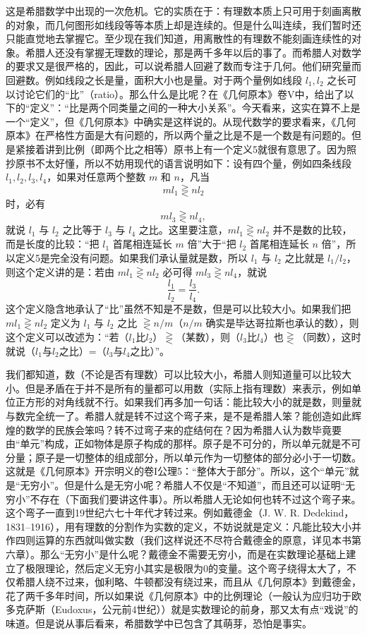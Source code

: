 这是希腊数学中出现的一次危机。它的实质在于：有理数本质上只可用于刻画离散的对象，而几何图形如线段等等本质上却是连续的。但是什么叫连续，我们暂时还只能直觉地去掌握它。至少现在我们知道，用离散性的有理数不能刻画连续性的对象。希腊人还没有掌握无理数的理论，那是两千多年以后的事了。而希腊人对数学的要求又是很严格的，因此，可以说希腊人回避了数而专注于几何。他们研究量而回避数。例如线段之长是量，面积大小也是量。对于两个量例如线段 $l_1,l_2$ 之长可以讨论它们的“比”（ratio）。那么什么是比呢？在《几何原本》卷V中，给出了以下的“定义”：“比是两个同类量之间的一种大小关系”。今天看来，这实在算不上是一个“定义”，但《几何原本》中确实是这样说的。从现代数学的要求看来，《几何原本》在严格性方面是大有问题的，所以两个量之比是不是一个数是有问题的。但是紧接着讲到比例（即两个比之相等）原书上有一个定义5就很有意思了。因为照抄原书不太好懂，所以不妨用现代的语言说明如下：设有四个量，例如四条线段 $l_1,l_2,l_3,l_4$，如果对任意两个整数 $m$ 和 $n$，凡当
\[
ml_1\gtreqless nl_2
\]
时，必有
\[
ml_3\gtreqless nl_4,
\]
就说 $l_1$ 与 $l_2$ 之比等于 $l_3$ 与 $l_4$ 之比。这里要注意，$ml_1\gtreqless nl_2$ 并不是数的比较，而是长度的比较：“把 $l_1$ 首尾相连延长 $m$ 倍”大于“把 $l_2$ 首尾相连延长 $n$ 倍”，所以定义5是完全没有问题。如果我们承认量就是数，所以 $l_1$ 与 $l_2$ 之比就是 $l_1/l_2$，则这个定义讲的是：若由 $ml_1\gtreqless nl_2$ 必可得 $ml_3\gtreqless nl_4$，就说
\[
\frac{l_1}{l_2}=\frac{l_3}{l_4}.
\]
这个定义隐含地承认了“比”虽然不知是不是数，但是可以比较大小。如果我们把 $ml_1\gtreqless nl_2$ 定义为 $l_1$ 与 $l_2$ 之比 $\gtreqless n/m$（$n/m$ 确实是毕达哥拉斯也承认的数），则这个定义可以改述为：“若（$l_1$比$l_2$）$\gtreqless$（某数），则（$l_3$比$l_4$）也$\gtreqless$（同数），这时就说（$l_1$与$l_2$之比）=（$l_3$与$l_4$之比）”。

我们都知道，数（不论是否有理数）可以比较大小，希腊人则知道量可以比较大小。但是矛盾在于并不是所有的量都可以用数（实际上指有理数）来表示，例如单位正方形的对角线就不行。如果我们再多加一句话：能比较大小的就是数，则量就与数完全统一了。希腊人就是转不过这个弯子来，是不是希腊人笨？能创造如此辉煌的数学的民族会笨吗？转不过弯子来的症结何在？因为希腊人认为数毕竟要由“单元”构成，正如物体是原子构成的那样。原子是不可分的，所以单元就是不可分量；原子是一切整体的组成部分，所以单元作为一切整体的部分必小于一切数。这就是《几何原本》开宗明义的卷I公理5：“整体大于部分”。所以，这个“单元”就是“无穷小”。但是什么是无穷小呢？希腊人不仅是“不知道”，而且还可以证明“无穷小”不存在（下面我们要讲这件事）。所以希腊人无论如何也转不过这个弯子来。这个弯子一直到19世纪六七十年代才转过来。例如戴德金（J. W. R. Dedekind，1831--1916），用有理数的分割作为实数的定义，不妨说就是定义：凡能比较大小并作四则运算的东西就叫做实数（我们这样说还不尽符合戴德金的原意，详见本书第六章）。那么“无穷小”是什么呢？戴德金不需要无穷小，而是在实数理论基础上建立了极限理论，然后定义无穷小其实是极限为0的变量。这个弯子绕得太大了，不仅希腊人绕不过来，伽利略、牛顿都没有绕过来，而且从《几何原本》到戴德金，花了两千多年时间，所以如果说《几何原本》中的比例理论（一般认为应归功于欧多克萨斯（Eudoxus，公元前4世纪））就是实数理论的前身，那又太有点“戏说”的味道。但是说从事后看来，希腊数学中已包含了其萌芽，恐怕是事实。

